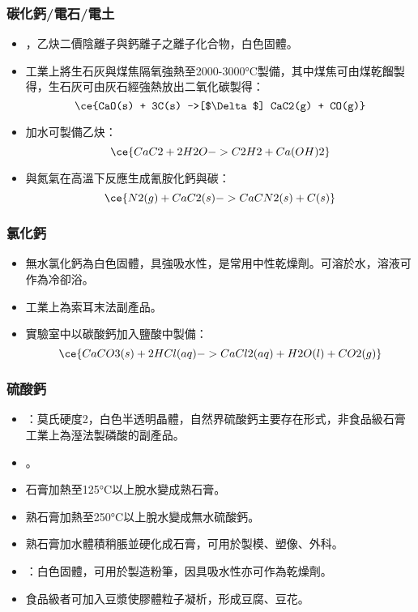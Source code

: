 \documentclass[a4paper,12pt]{report}
\begin{document}
\begin{itemize}
\begin{itemize}
\subsubsection{碳化鈣/電石/電土}
\begin{itemize}
\item {}，乙炔二價陰離子與鈣離子之離子化合物，白色固體。
\item 工業上將生石灰與煤焦隔氧強熱至2000-3000°C製備，其中煤焦可由煤乾餾製得，生石灰可由灰石經強熱放出二氧化碳製得：
\[\ce{CaO(s) + 3C(s) ->[$\Delta$] CaC2(g) + CO(g)}\]
\item 加水可製備乙炔：
\[\ce{CaC2 + 2H2O -> C2H2 + Ca(OH)2}\]
\item 與氮氣在高溫下反應生成氰胺化鈣與碳：
\[\ce{N2(g) + CaC2(s) -> CaCN2(s) + C(s)}\]
\end{itemize}
\subsubsection{氯化鈣}
\begin{itemize}
\item 無水氯化鈣為白色固體，具強吸水性，是常用中性乾燥劑。可溶於水，溶液可作為冷卻浴。
\item 工業上為索耳末法副產品。
\item 實驗室中以碳酸鈣加入鹽酸中製備：
\[\ce{CaCO3(s) + 2HCl(aq) -> CaCl2(aq) + H2O(l) + CO2(g)}\]
\end{itemize}
\subsubsection{硫酸鈣}
\begin{itemize}
\item {}：莫氏硬度2，白色半透明晶體，自然界硫酸鈣主要存在形式，非食品級石膏工業上為溼法製磷酸的副產品。
\item {}。
\item 石膏加熱至125°C以上脫水變成熟石膏。
\item 熟石膏加熱至250°C以上脫水變成無水硫酸鈣。
\item 熟石膏加水體積稍脹並硬化成石膏，可用於製模、塑像、外科。
\item {}：白色固體，可用於製造粉筆，因具吸水性亦可作為乾燥劑。
\item 食品級者可加入豆漿使膠體粒子凝析，形成豆腐、豆花。
\end{itemize}

\end{itemize}
\end{itemize}
\end{document}
